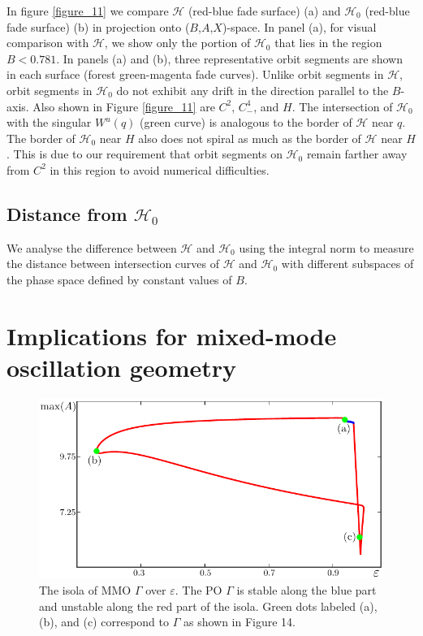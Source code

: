\documentclass{ws-ijbc}
\begin{document}
In figure \ref{figure_11} we compare $\mathscr{H}$ (red-blue fade surface) (a) and $\mathscr{H}_0$ (red-blue fade surface) (b) in projection onto ($B$,$A$,$X$)-space.  In panel (a), for visual comparison with $\mathscr{H}$, we show only the portion of $\mathscr{H}_0$ that lies in the region $B < 0.781$.  In panels (a) and (b), three representative orbit segments are shown in each surface (forest green-magenta fade curves).  Unlike orbit segments in $\mathscr{H}$, orbit segments in $\mathscr{H}_0$ do not exhibit any drift in the direction parallel to the $B$-axis.  Also shown in Figure \ref{figure_11} are $C^2$, $C^4_-$, and $H$.  The intersection of $\mathscr{H}_0$ with the singular $W^u(q)$ (green curve) is analogous to the border of $\mathscr{H}$ near $q$.  The border of $\mathscr{H}_0$ near $H$ also does not spiral as much as the border of $\mathscr{H}$ near $H$.  This is due to our requirement that orbit segments on $\mathscr{H}_0$ remain farther away from $C^2$ in this region to avoid numerical difficulties.

\subsection{Distance from $\mathscr{H}_0$}

We analyse the difference between $\mathscr{H}$ and $\mathscr{H}_0$ using the integral norm to measure the distance between intersection curves of $\mathscr{H}$ and $\mathscr{H}_0$ with different subspaces of the phase space defined by constant values of $B$.


\section{Implications for mixed-mode oscillation geometry}


\begin{figure}[H]
\centering
\includegraphics[]{./figures/MKMO_12.pdf}
\caption{The isola of MMO $\Gamma$ over $\varepsilon$.  The PO $\Gamma$ is stable along the blue part and unstable along the red part of the isola.  Green dots labeled (a), (b), and (c) correspond to $\Gamma$ as shown in Figure 14.}
\label{figure_12}
\end{figure}
\end{document}

